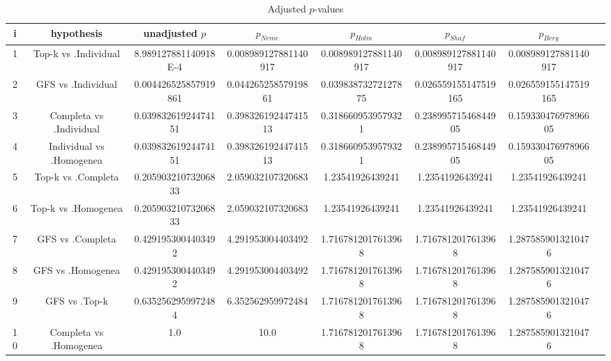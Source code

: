\documentclass[a4paper,10pt]{article}
\begin{document}
\begin{landscape}
\begin{table}[!htp]
\centering\tiny
\caption{Adjusted $p$-values}
\begin{tabular}{cccccccc}
i&hypothesis&unadjusted $p$&$p_{Neme}$&$p_{Holm}$&$p_{Shaf}$&$p_{Berg}$\\
\hline
1&Top-k vs .Individual&8.989127881140918E-4&0.008989127881140917&0.008989127881140917&0.008989127881140917&0.008989127881140917\\
2&GFS vs .Individual&0.004426525857919861&0.04426525857919861&0.03983873272127875&0.026559155147519165&0.026559155147519165\\
3&Completa vs .Individual&0.03983261924474151&0.39832619244741513&0.3186609539579321&0.23899571546844905&0.15933047697896605\\
4&Individual vs .Homogenea&0.03983261924474151&0.39832619244741513&0.3186609539579321&0.23899571546844905&0.15933047697896605\\
5&Top-k vs .Completa&0.20590321073206833&2.059032107320683&1.23541926439241&1.23541926439241&1.23541926439241\\
6&Top-k vs .Homogenea&0.20590321073206833&2.059032107320683&1.23541926439241&1.23541926439241&1.23541926439241\\
7&GFS vs .Completa&0.4291953004403492&4.291953004403492&1.7167812017613968&1.7167812017613968&1.2875859013210476\\
8&GFS vs .Homogenea&0.4291953004403492&4.291953004403492&1.7167812017613968&1.7167812017613968&1.2875859013210476\\
9&GFS vs .Top-k&0.6352562959972484&6.352562959972484&1.7167812017613968&1.7167812017613968&1.2875859013210476\\
10&Completa vs .Homogenea&1.0&10.0&1.7167812017613968&1.7167812017613968&1.2875859013210476\\
\hline
\end{tabular}
\end{table}

\end{landscape}
\end{document}
